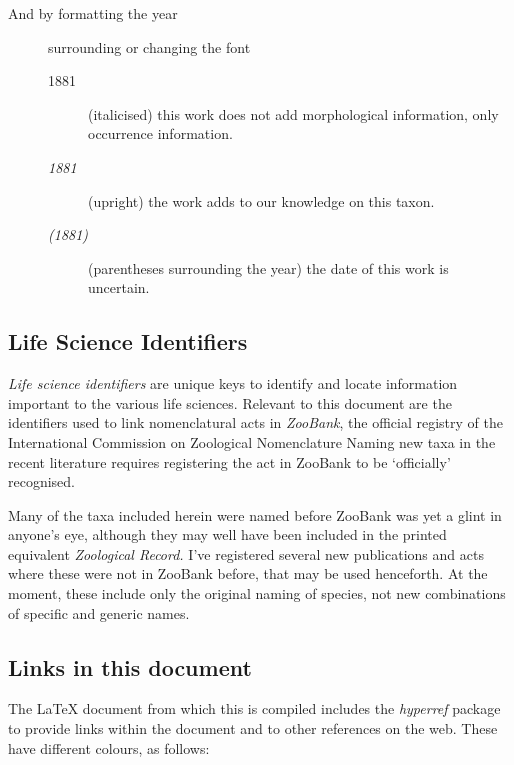 \begin{description}
\item[And by formatting the year] surrounding or changing the font
    \begin{description}
        \item[1881] (italicised) this work does not add morphological
            information, only occurrence information.
        \item[\emph{1881}] (upright) the work adds to our knowledge on this taxon.
        \item[\emph{(1881)}] (parentheses surrounding the year) the date of this work is
            uncertain.
    \end{description}
\end{description}

\subsection{Life Science Identifiers }%
\label{ssec:introduction-lsid}

\emph{Life science
identifiers} are unique keys
to identify and locate information important to the various life sciences.
Relevant to this document are the identifiers used to link nomenclatural acts in
\emph{ZooBank}, the official registry of the International
Commission on Zoological Nomenclature  Naming new taxa in the
recent literature requires registering the act in ZooBank to be ‘officially’
recognised.

Many of the taxa included herein were named before ZooBank was yet a glint in
anyone's eye, although they may well have been included in the printed
equivalent \emph{Zoological Record.} I've registered several new publications
and acts where these were not in ZooBank before, that may be used henceforth. At
the moment, these include only the original naming of species, not new
combinations of specific and generic names.

\subsection{Links in this document}%
\label{sub:introduction-links}

The \LaTeX{} document from which this  is compiled includes the
\emph{hyperref} package to provide links within the
document and to other references on the
web. These have different
colours, as follows:

